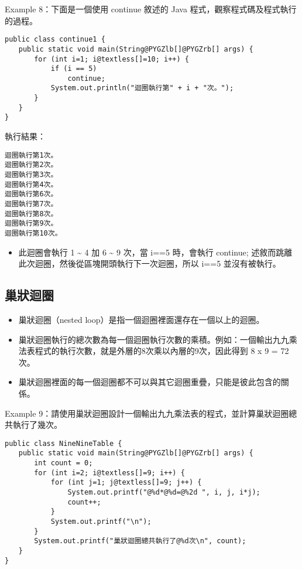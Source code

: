 \documentclass[a4paper,12pt,english]{sphinxmanual}
\begin{document}
Example 8：下面是一個使用 continue 敘述的 Java 程式，觀察程式碼及程式執行的過程。

\begin{Verbatim}[commandchars=@\[\]]
public class continue1 {
　　public static void main(String@PYGZlb[]@PYGZrb[] args) {
       for (int i=1; i@textless[]=10; i++) {
           if (i == 5)
               continue;
           System.out.println("迴圈執行第" + i + "次。");
       }
　　}
}
\end{Verbatim}

執行結果：

\begin{Verbatim}[commandchars=@\[\]]
迴圈執行第1次。
迴圈執行第2次。
迴圈執行第3次。
迴圈執行第4次。
迴圈執行第6次。
迴圈執行第7次。
迴圈執行第8次。
迴圈執行第9次。
迴圈執行第10次。
\end{Verbatim}
\begin{itemize}
\item {} 
此迴圈會執行 1 \textasciitilde{} 4 加 6 \textasciitilde{} 9 次，當 i==5 時，會執行 continue; 述敘而跳離此次迴圈，然後從區塊開頭執行下一次迴圈，所以 i==5 並沒有被執行。

\end{itemize}


\subsection{巢狀迴圈}
\label{java_loop:id3}\begin{itemize}
\item {} 
巢狀迴圈（nested loop）是指一個迴圈裡面還存在一個以上的迴圈。

\item {} 
巢狀迴圈執行的總次數為每一個迴圈執行次數的乘積。例如：一個輸出九九乘法表程式的執行次數，就是外層的8次乘以內層的9次，因此得到 8 x 9 = 72 次。

\item {} 
巢狀迴圈裡面的每一個迴圈都不可以與其它迴圈重疊，只能是彼此包含的關係。

\end{itemize}

Example 9：請使用巢狀迴圈設計一個輸出九九乘法表的程式，並計算巢狀迴圈總共執行了幾次。

\begin{Verbatim}[commandchars=@\[\]]
public class NineNineTable {
　　public static void main(String@PYGZlb[]@PYGZrb[] args) {
       int count = 0;
       for (int i=2; i@textless[]=9; i++) {
           for (int j=1; j@textless[]=9; j++) {
               System.out.printf("@%d*@%d=@%2d ", i, j, i*j);
               count++;
           }
           System.out.printf("\n");
       }
       System.out.printf("巢狀迴圈總共執行了@%d次\n", count);
　　}
}
\end{Verbatim}
\end{document}
